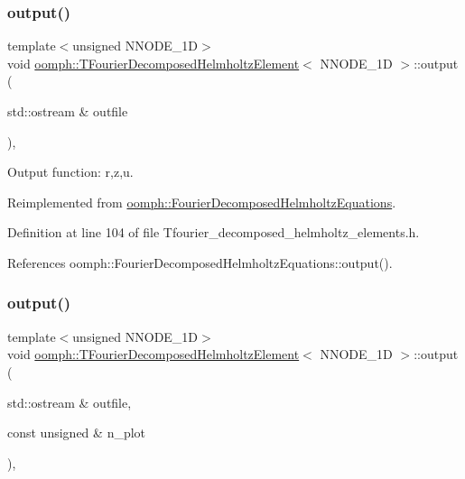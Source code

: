 \subsubsection{\texorpdfstring{output()}{output()}\hspace{0.1cm}{\footnotesize\ttfamily [1/4]}}
{\footnotesize\ttfamily template$<$unsigned N\+N\+O\+D\+E\+\_\+1D$>$ \\
void \hyperlink{classoomph_1_1TFourierDecomposedHelmholtzElement}{oomph\+::\+T\+Fourier\+Decomposed\+Helmholtz\+Element}$<$ N\+N\+O\+D\+E\+\_\+1D $>$\+::output (\begin{DoxyParamCaption}\item[{std\+::ostream \&}]{outfile }\end{DoxyParamCaption})\hspace{0.3cm}{\ttfamily [inline]}, {\ttfamily [virtual]}}



Output function\+: r,z,u. 



Reimplemented from \hyperlink{classoomph_1_1FourierDecomposedHelmholtzEquations_aaa7d646147698753b363fe2f5adadeb1}{oomph\+::\+Fourier\+Decomposed\+Helmholtz\+Equations}.



Definition at line 104 of file Tfourier\+\_\+decomposed\+\_\+helmholtz\+\_\+elements.\+h.



References oomph\+::\+Fourier\+Decomposed\+Helmholtz\+Equations\+::output().

\mbox{\label{classoomph_1_1TFourierDecomposedHelmholtzElement_a1ee5d590a4d0bcd09e88a4016834a83f}} 
\subsubsection{\texorpdfstring{output()}{output()}\hspace{0.1cm}{\footnotesize\ttfamily [2/4]}}
{\footnotesize\ttfamily template$<$unsigned N\+N\+O\+D\+E\+\_\+1D$>$ \\
void \hyperlink{classoomph_1_1TFourierDecomposedHelmholtzElement}{oomph\+::\+T\+Fourier\+Decomposed\+Helmholtz\+Element}$<$ N\+N\+O\+D\+E\+\_\+1D $>$\+::output (\begin{DoxyParamCaption}\item[{std\+::ostream \&}]{outfile,  }\item[{const unsigned \&}]{n\+\_\+plot }\end{DoxyParamCaption})\hspace{0.3cm}{\ttfamily [inline]}, {\ttfamily [virtual]}}




